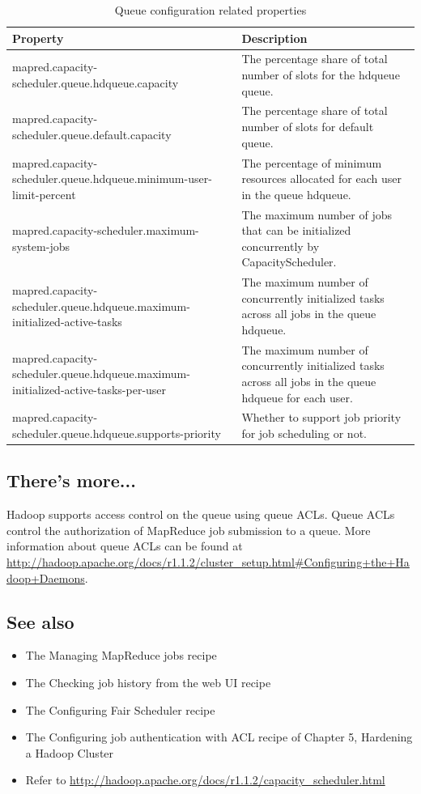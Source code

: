 \begin{table}[h]
  \scriptsize
  \centering
  \begin{tabular}{p{}p{}}
    \toprule 
    \textbf{Property} & \textbf{Description} \\ \midrule
    mapred.capacity-scheduler.queue.hdqueue.capacity & The percentage share of total number of slots for the hdqueue queue. \\
    mapred.capacity-scheduler.queue.default.capacity & The percentage share of total number of slots for default queue.\\
    mapred.capacity-scheduler.queue.hdqueue.minimum-user-limit-percent & The percentage of minimum resources allocated for each user in the queue hdqueue. \\
    mapred.capacity-scheduler.maximum-system-jobs & The maximum number of jobs that can be initialized concurrently by CapacityScheduler. \\
    mapred.capacity-scheduler.queue.hdqueue.maximum-initialized-active-tasks & The maximum number of concurrently initialized tasks across all jobs in the queue hdqueue. \\
    mapred.capacity-scheduler.queue.hdqueue.maximum-initialized-active-tasks-per-user & The maximum number of concurrently initialized tasks across all jobs in the queue hdqueue for each user. \\
    mapred.capacity-scheduler.queue.hdqueue.supports-priority & Whether to support job priority for job scheduling or not. \\ \bottomrule
  \end{tabular}
  \caption{Queue configuration related properties}\label{tbl:queueconfig}
\end{table}

\subsection*{There's more...}
Hadoop supports access control on the queue using queue ACLs. Queue ACLs control the authorization of MapReduce job submission to a queue. More information about queue ACLs can be found at \url{http://hadoop.apache.org/docs/r1.1.2/cluster_setup.html#Configuring+the+Hadoop+Daemons}.

\subsection*{See also}
\begin{itemize}
  \item The Managing MapReduce jobs recipe
  \item The Checking job history from the web UI recipe
  \item The Configuring Fair Scheduler recipe
  \item The Configuring job authentication with ACL recipe of Chapter 5, Hardening a Hadoop Cluster
  \item Refer to \url{http://hadoop.apache.org/docs/r1.1.2/capacity_scheduler.html}
\end{itemize}

